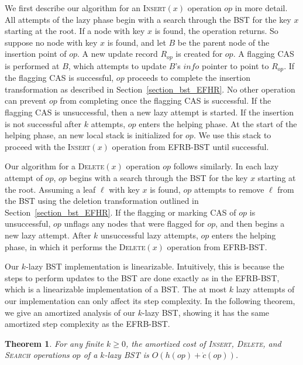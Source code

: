 \documentclass[letterpaper,twocolumn]{article}
\newtheorem{theorem}{Theorem}[]
\newcommand{\info}{\mathit{info}}
\begin{document}
We first describe our algorithm for an \textsc{Insert}$(x)$ operation $op$ in more detail. All attempts of the lazy phase begin with a search through the BST for the key $x$ starting at the root. If a node with key $x$ is found, the operation returns. So suppose no node with key $x$ is found, and let $B$ be the parent node of the insertion point of $op$. A new update record $R_{op}$ is created for $op$. A flagging CAS is performed at $B$, which attempts to update $B$'s $\info$ pointer to point to $R_{op}$. If the flagging CAS is successful, $op$ proceeds to complete the insertion transformation as described in Section~\ref{section_bst_EFHR}. No other operation can prevent $op$ from completing once the flagging CAS is successful. If the flagging CAS is unsuccessful, then a new lazy attempt is started. If the insertion is not successful after $k$ attempts, $op$ enters the helping phase. At the start of the helping phase, an new local stack is initialized for $op$. We use this stack to proceed with the \textsc{Insert}$(x)$ operation from EFRB-BST until successful.

Our algorithm for a \textsc{Delete}$(x)$ operation $op$ follows similarly. In each lazy attempt of $op$, $op$ begins with a search through the BST for the key $x$ starting at the root. Assuming a leaf $\ell$ with key $x$ is found, $op$ attempts to remove $\ell$ from the BST using the deletion transformation outlined in Section~\ref{section_bst_EFHR}. If the flagging or marking CAS of $op$ is unsuccessful, $op$ unflags any nodes that were flagged for $op$, and then begins a new lazy attempt. After $k$ unsuccessful lazy attempts, $op$ enters the helping phase, in which it performs the \textsc{Delete}$(x)$ operation from EFRB-BST.

Our $k$-lazy BST implementation is linearizable. Intuitively, this is because the steps to perform updates to the BST are done exactly as in the EFRB-BST, which is a linearizable implementation of a BST. The at most $k$ lazy attempts of our implementation can only affect its step complexity. In the following theorem, we give an amortized analysis of our $k$-lazy BST, showing it has the same amortized step complexity as the EFRB-BST.

\begin{theorem}
For any finite $k \geq 0$, the amortized cost of \textsc{Insert}, \textsc{Delete}, and \textsc{Search} operations $op$ of a $k$-lazy BST is $O(h(op) + \dot{c}(op))$.
\end{theorem}
\end{document}
